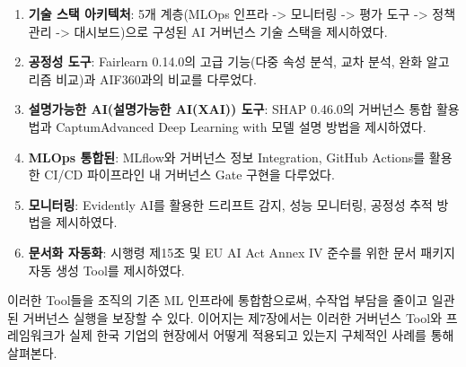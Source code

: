 \begin{enumerate}
 \item \textbf{기술 스택 아키텍처}: 
 5개 계층(MLOps 인프라 -> 모니터링 -> 평가 도구 -> 정책 관리 -> 대시보드)으로 
 구성된 AI 거버넌스 기술 스택을 제시하였다.
 
 \item \textbf{공정성 도구}: 
 Fairlearn 0.14.0의 고급 기능(다중 속성 분석, 교차 분석, 완화 알고리즘 비교)과 
 AIF360과의 비교를 다루었다.
 
 \item \textbf{설명가능한 AI(설명가능한 AI(XAI)) 도구}: 
 SHAP 0.46.0의 거버넌스 통합 활용법과 
 CaptumAdvanced Deep Learning with 모델 설명 방법을 제시하였다.
 
 \item \textbf{MLOps 통합된}: 
 MLflow와 거버넌스 정보 Integration, GitHub Actions를 활용한 
 CI/CD 파이프라인 내 거버넌스 Gate 구현을 다루었다.
 
 \item \textbf{모니터링}: 
 Evidently AI를 활용한 드리프트 감지, 성능 모니터링, 
 공정성 추적 방법을 제시하였다.
 
 \item \textbf{문서화 자동화}: 
 시행령 제15조 및 EU AI Act Annex IV 준수를 위한 
 문서 패키지 자동 생성 Tool를 제시하였다.
\end{enumerate}

이러한 Tool들을 조직의 기존 ML 인프라에 통합함으로써, 수작업 부담을 줄이고 일관된 거버넌스 실행을 보장할 수 있다. 이어지는 제7장에서는 이러한 거버넌스 Tool와 프레임워크가 실제 한국 기업의 현장에서 어떻게 적용되고 있는지 구체적인 사례를 통해 살펴본다.
